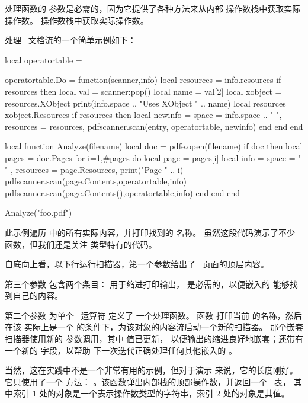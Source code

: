 处理函数的  参数是必需的，因为它提供了各种方法来从内部
操作数栈中获取实际操作数。
操作数栈中获取实际操作数。

处理 \PDF\ 文档流的一个简单示例如下：

\begin{typing}
local operatortable = { }

operatortable.Do = function(scanner,info)
    local resources = info.resources
    if resources then
        local val     = scanner:pop()
        local name    = val[2]
        local xobject = resources.XObject
        print(info.space .. "Uses XObject " .. name)
        local resources = xobject.Resources
        if resources then
            local newinfo =  {
                space     = info.space .. "  ",
                resources = resources,
            }
            pdfscanner.scan(entry, operatortable, newinfo)
        end
    end
end

local function Analyze(filename)
    local doc = pdfe.open(filename)
    if doc then
        local pages = doc.Pages
        for i=1,#pages do
            local page = pages[i]
            local info = {
              space     = "  " ,
              resources = page.Resources,
            }
            print("Page " .. i)
         -- pdfscanner.scan(page.Contents,operatortable,info)
            pdfscanner.scan(page.Contents(),operatortable,info)
        end
    end
end

Analyze("foo.pdf")
\end{typing}

此示例遍历 \PDF 中的所有实际内容，并打印找到的  名称。
虽然这段代码演示了不少  函数，但我们还是关注
 类型特有的代码。

自底向上看，以下行运行扫描器，第一个参数给出了 \PDF\ 页面的顶层内容。

第三个参数  包含两个条目： 用于缩进打印输出，
 是必需的，以便嵌入的  能够找到自己的内容。

第二个参数  为单个 \PDF\ 运算符  定义了
一个处理函数。
函数  打印当前  的名称，然后在该 
实际上是一个  的条件下，为该对象的内容流启动一个新的扫描器。
那个嵌套扫描器使用新的  参数调用，其中  值已更新，
以便输出的缩进良好地嵌套；还带有一个新的  字段，以帮助
下一次迭代正确处理任何其他嵌入的 。

当然，这在实践中不是一个非常有用的示例，但对于演示 
来说，它的长度刚好。它只使用了一个  方法：
。该函数弹出内部栈的顶部操作数，并返回一个 \LUA\ 表，
其中索引 1 处的对象是一个表示操作数类型的字符串，索引 2 处的对象是其值。


